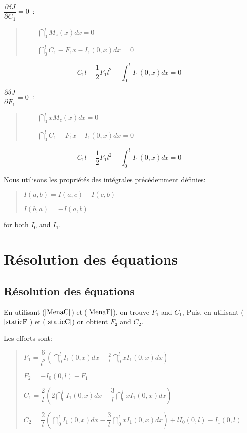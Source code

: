 $\dfrac{\partial \delta J}{\partial C_1}=0$~:

\begin{quotation}
$\qquad \dint_0^lM_z(x)dx=0$

$\qquad \dint_0^lC_1-F_1x-I_1(0,x)dx=0$
\end{quotation}

\begin{equation}
   \label{MenaC}
   C_1l-\frac 12F_1l^2-\int_0^lI_1(0,x)dx=0
\end{equation}

$\dfrac{\partial \delta J}{\partial F_1}=0$~:

\begin{quotation}
$\qquad \dint_0^lxM_z(x)dx=0$

$\qquad \dint_0^lC_1-F_1x-I_1(0,x)dx=0$
\end{quotation}

\begin{equation}
   \label{MenaF}
   C_1l-\frac 12F_1l^2-\int_0^lI_1(0,x)dx=0
\end{equation}

Nous utilisons les propriétés des intégrales précédemment définies:

\begin{quotation}
$I(a,b)=I(a,c)+I(c,b)$

$I(b,a)=-I(a,b)$
\end{quotation}

for both $I_0$ and $I_1$.


\medskip
\ifVersionAvecExemplesSepares
   \section{Résolution des équations}
\else
   \subsection{Résolution des équations}
\fi

En utilisant ($\ref{MenaC}$) et ($\ref{MenaF}$), on trouve $F_1$ and $C_1$,
Puis, en utilisant ($\ref{staticF}$) et ($\ref{staticC}$) on obtient $F_2$ and $C_2$.

Les efforts sont:

\begin{quotation}
$F_1=\dfrac 6{l^2}\left( \dint_0^lI_1(0,x)dx-\frac
2l\dint_0^lxI_1(0,x)dx\right) $

$F_2=-I_0(0,l)-F_1$

$C_1=\dfrac 2l\left( 2\dint_0^lI_1(0,x)dx-\dfrac
3l\dint_0^lxI_1(0,x)dx\right) $

$C_2=\dfrac 2l\left( \dint_0^lI_1(0,x)dx-\dfrac
3l\dint_0^lxI_1(0,x)dx\right) +lI_0(0,l)-I_1(0,l)$
\end{quotation}

